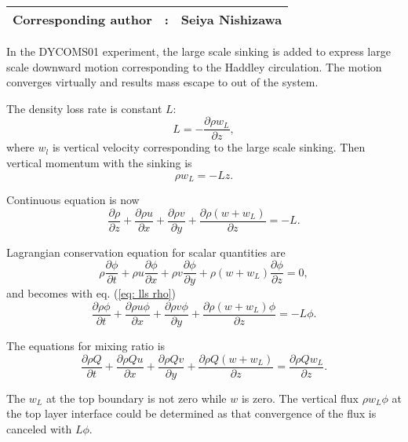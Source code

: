 {\bf \Large 
\begin{tabular}{ccc}
\hline
  Corresponding author & : & Seiya Nishizawa\\
\hline
\end{tabular}
}


In the DYCOMS01 experiment, the large scale sinking is added
to express large scale downward motion corresponding to the Haddley circulation.
The motion converges virtually and results mass escape to out of the system.

The density loss rate is constant $L$:
\begin{equation}
  L = -\frac{\partial \rho w_L}{\partial z},
\end{equation}
where $w_l$ is vertical velocity corresponding to the large scale sinking.
Then vertical momentum with the sinking is
\begin{equation}
  \rho w_L = -Lz.
\end{equation}

Continuous equation is now
\begin{equation}
  \frac{\partial \rho}{\partial z}
  + \frac{\partial \rho u}{\partial x}
  + \frac{\partial \rho v}{\partial y}
  + \frac{\partial \rho (w+w_L)}{\partial z}
  = -L.
  \label{eq: lls rho}
\end{equation}

Lagrangian conservation equation for scalar quantities are
\begin{equation}
  \rho\frac{\partial \phi}{\partial t}
  + \rho u\frac{\partial \phi}{\partial x}
  + \rho v\frac{\partial \phi}{\partial y}
  + \rho (w+w_L)\frac{\partial \phi}{\partial z}
  = 0,
\end{equation}
and becomes with eq. (\ref{eq: lls rho})
\begin{equation}
  \frac{\partial \rho\phi}{\partial t}
  + \frac{\partial \rho u \phi}{\partial x}
  + \frac{\partial \rho v \phi}{\partial y}
  + \frac{\partial \rho (w+w_L) \phi}{\partial z}
  = -L\phi.
\end{equation}

The equations for mixing ratio is
\begin{equation}
  \frac{\partial \rho Q}{\partial t}
  + \frac{\partial \rho Q u }{\partial x}
  + \frac{\partial \rho Q v}{\partial y}
  + \frac{\partial \rho Q (w+w_L)}{\partial z}
  = \frac{\partial \rho Q w_L}{\partial z}.
\end{equation}

The $w_L$ at the top boundary is not zero while $w$ is zero.
The vertical flux $\rho w_L \phi$ at the top layer interface could be determined as
that convergence of the flux is canceled with $L\phi$.


